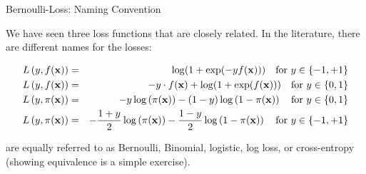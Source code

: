 \documentclass[11pt,compress,t,notes=noshow, xcolor=table]{beamer}
\begin{document}
\begin{vbframe}{Bernoulli-Loss: Naming Convention}

We have seen three loss functions that are closely related. In the literature, there are different names for the losses: 


\begin{eqnarray*} L\left(y, f(\mathbf{x})\right) &=& \log(1+\exp(-yf(\mathbf{x}))) \quad \text{for } y \in \{-1, +1\} \\
L\left(y, f(\mathbf{x})\right) &=& - y \cdot f(\mathbf{x}) + \log(1 + \exp(f(\mathbf{x}))) \quad \text{for } y \in \{0, 1\} \\
L\left(y, \pi(\mathbf{x})\right) &=& - y \log \left(\pi(\mathbf{x})\right) - (1 - y) \log \left(1 - \pi(\mathbf{x})\right) \quad \text{for } y \in \{0, 1\} \\
L\left(y, \pi(\mathbf{x})\right) &=& - \frac{1 + y}{2} \log\left(\pi(\mathbf{x})\right) - \frac{1 - y}{2} \log\left(1 - \pi(\mathbf{x})\right) \quad \text{for } y \in \{-1, +1\} \end{eqnarray*}

\lz

are equally referred to as Bernoulli, Binomial, logistic, log loss, or cross-entropy (showing equivalence is a simple exercise).





\end{vbframe}
\end{document}
